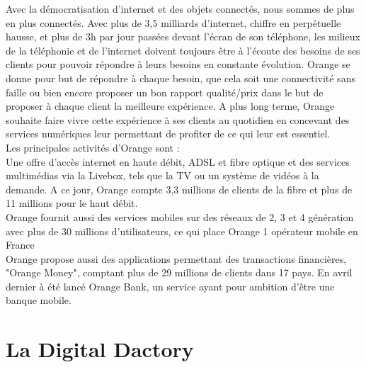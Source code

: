 Avec la démocratisation d'internet et des objets connectés, nous sommes de plus en plus connectés. Avec plus de 3,5 milliards d'internet, chiffre en perpétuelle hausse, et plus de 3h par jour passées devant l'écran de son téléphone, les milieux de la téléphonie et de l'internet doivent toujours être à l'écoute des besoins de ses clients pour pouvoir répondre à leurs besoins en constante évolution. Orange se donne pour but de répondre à chaque besoin, que cela soit une connectivité sans faille ou bien encore proposer un bon rapport qualité/prix dans le but de proposer à chaque client la meilleure expérience. A plus long terme, Orange souhaite faire vivre cette expérience à ses clients au quotidien en concevant des services numériques leur permettant de profiter de ce qui leur est essentiel. \\
Les principales activités d'Orange sont :\\
Une offre d'accès internet en haute débit, ADSL et fibre optique et des services multimédias via la Livebox, tels que la TV ou un système de vidéos à la demande. A ce jour, Orange compte 3,3 millions de clients de la fibre et plus de 11 millions pour le haut débit.\\
Orange fournit aussi des services mobiles sur des réseaux de 2, 3 et 4 génération avec plus de 30 millions d'utilisateurs, ce qui place Orange 1 opérateur mobile en France\\
Orange propose aussi des applications permettant des transactions financières, "Orange Money", comptant plus de 29 millions de clients dans 17 pays. En avril dernier à été lancé Orange Bank, un service ayant pour ambition d'être une banque mobile.


\section{La Digital Dactory}



